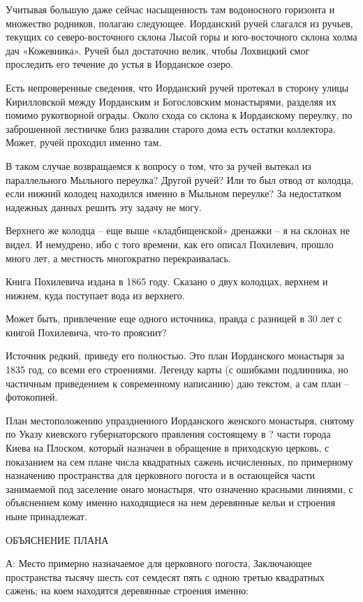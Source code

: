 Учитывая большую даже сейчас насыщенность там водоносного горизонта и множество родников, полагаю следующее. Иорданский ручей слагался из ручьев, текущих со северо-восточного склона Лысой горы и юго-восточного склона холма дач «Кожевника». Ручей был достаточно велик, чтобы Лохвицкий смог проследить его течение до устья в Иорданское озеро. 

Есть непроверенные сведения, что Иорданский ручей протекал в сторону улицы Кирилловской между Иорданским и Богословским монастырями, разделяя их помимо рукотворной ограды. Около схода со склона к Иорданскому переулку, по заброшенной лестничке близ развалин старого дома есть остатки коллектора. Может, ручей проходил именно там.

В таком случае возвращаемся к вопросу о том, что за ручей вытекал из параллельного Мыльного переулка? Другой ручей? Или то был отвод от колодца, если нижний колодец находился именно в Мыльном переулке? За недостатком надежных данных решить эту задачу не могу.

Верхнего же колодца – еще выше «кладбищенской» дренажки – я на склонах не видел. И немудрено, ибо с того времени, как его описал Похилевич, прошло много лет, а местность многократно перекраивалась.

Книга Похилевича издана в 1865 году. Сказано о двух колодцах, верхнем и нижнем, куда поступает вода из верхнего.

Может быть, привлечение еще одного источника, правда с разницей в 30 лет с книгой Похилевича, что-то прояснит?

Источник редкий, приведу его полностью. Это план Иорданского монастыря за 1835 год, со всеми его строениями. Легенду карты (с ошибками подлинника, но частичным приведением к современному написанию) даю текстом, а сам план – фотокопией.

План местоположению упраздненного Иорданского женского монастыря, снятому по Указу киевского губернаторского правления состоящему в ? части города Киева на Плоском, который назначен в обращение в приходскую церковь, с показанием на сем плане числа квадратных сажень исчисленных, по примерному назначению пространства для церковного погоста и в остающейся части занимаемой под заселение онаго монастыря, что означенно красными линиями, с объяснением кому именно находящиеся на нем деревянные кельи и строения ныне принадлежат.

ОБЪЯСНЕНИЕ ПЛАНА

А: Место примерно назначаемое для церковного погоста, Заключающее пространства тысячу шесть сот семдесят пять с одною третью квадратных сажень; на коем находятся деревянные строения именно:

